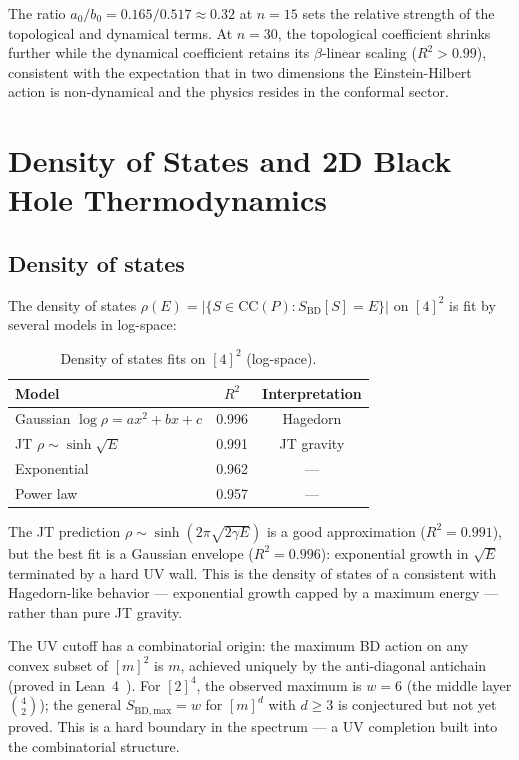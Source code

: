 \documentclass[aps,prd,twocolumn,superscriptaddress]{revtex4-2}
\begin{document}
The ratio $a_0/b_0 = 0.165/0.517 \approx 0.32$ at $n = 15$ sets the
relative strength of the topological and dynamical terms. At $n = 30$,
the topological coefficient shrinks further while the dynamical
coefficient retains its $\beta$-linear scaling ($R^2 > 0.99$),
consistent with the expectation that in two dimensions the
Einstein-Hilbert action is non-dynamical and the physics resides in
the conformal sector.


\section{Density of States and 2D Black Hole Thermodynamics}
\label{sec:dos}

\subsection{Density of states}

The density of states $\rho(E) = |\{S \in \mathrm{CC}(P) :
S_{\mathrm{BD}}[S] = E\}|$ on $[4]^2$ is fit by several models in
log-space:

\begin{table}[h]
\caption{Density of states fits on $[4]^2$ (log-space).}
\label{tab:dos}
\begin{ruledtabular}
\begin{tabular}{lcc}
Model & $R^2$ & Interpretation \\
\midrule
Gaussian $\log\rho = ax^2{+}bx{+}c$ & 0.996 & Hagedorn \\
JT $\rho \sim \sinh\sqrt{E}$ & 0.991 & JT gravity \\
Exponential & 0.962 & --- \\
Power law & 0.957 & --- \\
\end{tabular}
\end{ruledtabular}
\end{table}

The JT prediction $\rho \sim \sinh(2\pi\sqrt{2\gamma E})$ is a good
approximation ($R^2 = 0.991$), but the best fit is a Gaussian
envelope ($R^2 = 0.996$): exponential growth in $\sqrt{E}$
terminated by a hard UV wall. This is the density of states of a
consistent with Hagedorn-like behavior --- exponential growth capped by a maximum
energy --- rather than pure JT gravity.

The UV cutoff has a combinatorial origin: the maximum BD action on
any convex subset of $[m]^2$ is $m$, achieved uniquely by the
anti-diagonal antichain (proved in Lean~4~\cite{leanrepo}).
For $[2]^4$, the observed maximum is $w = 6$
(the middle layer $\binom{4}{2}$); the general
$S_{\mathrm{BD,max}} = w$ for $[m]^d$ with $d \geq 3$ is
conjectured but not yet proved. This is a hard boundary in
the spectrum --- a UV completion built into the combinatorial
structure.
\end{document}
